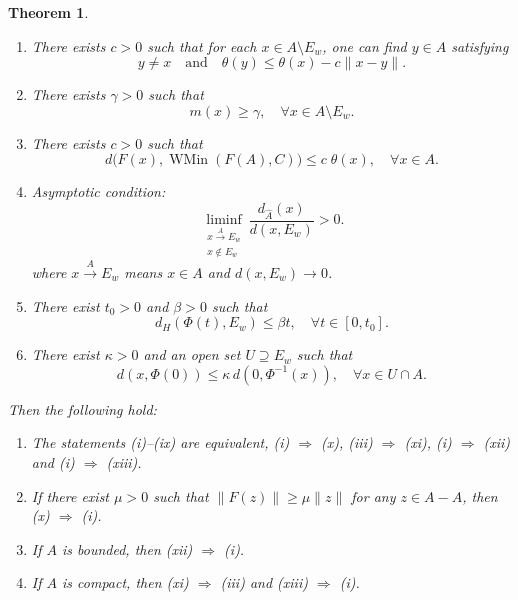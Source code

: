 \documentclass[11pt]{article}
\newtheorem{theorem}{Theorem}[section]
\begin{document}
\begin{theorem}
\begin{enumerate}
			
			
			\item[(viii)] There exists   \(c>0\) such that for each \(x\in A\setminus E_w\), one can find \(y\in A\) satisfying
			\begin{equation}\label{EevL}
				y\neq x \quad\text{and}\quad
				\theta(y)\le \theta(x)-c\|x-y\| .
	 \end{equation}
			
					\item[(ix)]   There exists   \(\gamma >0\) such that
				\[
				m(x)\ge \gamma,\quad\forall x\in A\setminus E_w.
				\]
			
			 	\item[(x)]  There exists $c>0$ such that    
 	$$ d \bigl(F(x),\operatorname{WMin}(F(A),C)\bigr)     \le c \; \theta(x),   \quad  \forall x\in A.$$ 
		
		\item[(xi)]  Asymptotic   condition:
		\[
		\liminf_{\substack{x\xrightarrow{A} E_w\\ x\notin E_w}}\frac{d_{\widehat{A}}(x)}{d(x,E_w)}>0.
		\]
		where $x\xrightarrow{A} E_w$ means $x\in A$ and $d(x,E_w)\to 0$.
		
		\item[(xii)] There exist \(t_0 > 0\) and \(\beta > 0\) such that 
		\[
		d_H(\Phi(t), E_w) \le \beta t,  \quad  \forall t \in [0, t_0].
		\]
 
		
	\item[(xiii)] There exist $\kappa>0$ and an open set $U\supseteq E_w$ such that \begin{equation}\label{EBkmJ} 
			d(x,\Phi(0))\le\kappa\,d(0,\Phi^{-1}(x)),       \quad  \forall       x\in U\cap A. 	
			\end{equation}	 
	\end{enumerate}
	 	Then the following hold:
		\begin{enumerate}
		\item The statements (i)--(ix) are equivalent, (i) $\Rightarrow$ (x), (iii) $\Rightarrow$ (xi),  (i) $\Rightarrow$ (xii) and (i) $\Rightarrow$ (xiii). 
			\item  If there exist $\mu>0$ such that $\|F(z)\|\ge\mu\|z\|$ for any $z\in A-A$,
	then (x) $\Rightarrow$ (i).
			\item  If $A$ is bounded, then (xii) $\Rightarrow$ (i).
	 \item  	If $A$ is compact, then (xi) $\Rightarrow$ (iii) and (xiii) $\Rightarrow$ (i).  
	\end{enumerate}
\end{theorem}
\end{document}
